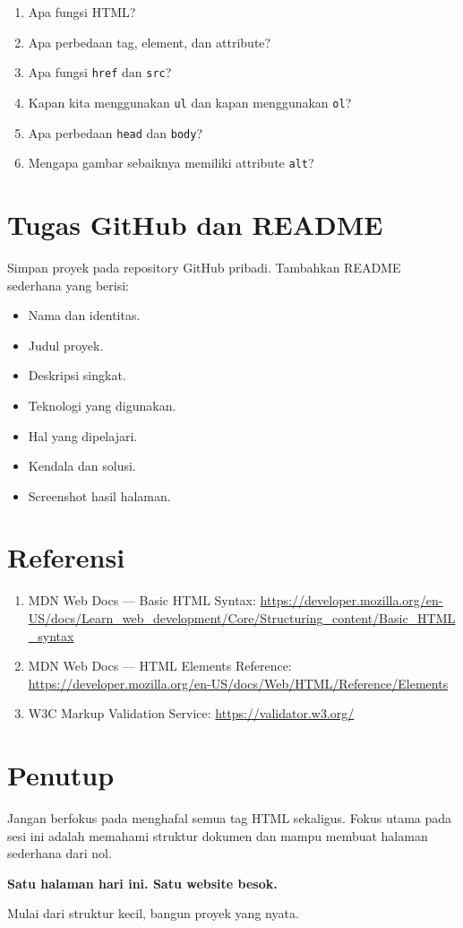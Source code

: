 \documentclass[11pt,a4paper]{article}
\begin{document}
\begin{enumerate}[label=\arabic*.]
    \item Apa fungsi HTML?
    \item Apa perbedaan tag, element, dan attribute?
    \item Apa fungsi \texttt{href} dan \texttt{src}?
    \item Kapan kita menggunakan \texttt{ul} dan kapan menggunakan \texttt{ol}?
    \item Apa perbedaan \texttt{head} dan \texttt{body}?
    \item Mengapa gambar sebaiknya memiliki attribute \texttt{alt}?
\end{enumerate}

\section{Tugas GitHub dan README}

Simpan proyek pada repository GitHub pribadi. Tambahkan README sederhana yang berisi:

\begin{itemize}
    \item Nama dan identitas.
    \item Judul proyek.
    \item Deskripsi singkat.
    \item Teknologi yang digunakan.
    \item Hal yang dipelajari.
    \item Kendala dan solusi.
    \item Screenshot hasil halaman.
\end{itemize}

\section{Referensi}

\begin{enumerate}
    \item MDN Web Docs — Basic HTML Syntax:
    \url{https://developer.mozilla.org/en-US/docs/Learn_web_development/Core/Structuring_content/Basic_HTML_syntax}
    \item MDN Web Docs — HTML Elements Reference:
    \url{https://developer.mozilla.org/en-US/docs/Web/HTML/Reference/Elements}
    \item W3C Markup Validation Service:
    \url{https://validator.w3.org/}
\end{enumerate}

\section{Penutup}

Jangan berfokus pada menghafal semua tag HTML sekaligus. Fokus utama pada sesi ini adalah memahami struktur dokumen dan mampu membuat halaman sederhana dari nol.

\begin{conceptbox}
\centering
\textbf{Satu halaman hari ini. Satu website besok.}

Mulai dari struktur kecil, bangun proyek yang nyata.
\end{conceptbox}
\end{document}
